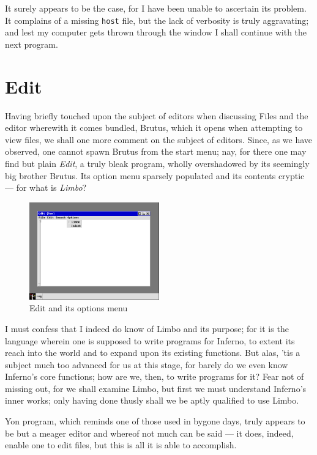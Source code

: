 \documentclass[a4paper,12pt]{report}
\begin{document}
      It surely appears to be the case, for I have been unable to ascertain its problem. It complains of a missing \texttt{host} file, but the lack of verbosity is truly aggravating; and lest my computer gets thrown through the window I shall continue with the next program.

      \section*{Edit}

      Having briefly touched upon the subject of editors when discussing Files and the editor wherewith it comes bundled, Brutus, which it opens when attempting to view files, we shall one more comment on the subject of editors. Since, as we have observed, one cannot spawn Brutus from the start menu; nay, for there one may find but plain \textit{Edit}, a truly bleak program, wholly overshadowed by its seemingly big brother Brutus. Its option menu sparsely populated and its contents cryptic — for what is \textit{Limbo}?

      \begin{figure}
        \centering
        \includegraphics[width=0.5\textwidth]{edit.png}
        \caption{Edit and its options menu}
      \end{figure}

      I must confess that I indeed do know of Limbo and its purpose; for it is the language wherein one is supposed to write programs for Inferno, to extent its reach into the world and to expand upon its existing functions. But alas, 'tis a subject much too advanced for us at this stage, for barely do we even know Inferno's core functions; how are we, then, to write programs for it? Fear not of missing out, for we shall examine Limbo, but first we must understand Inferno's inner works; only having done thusly shall we be aptly qualified to use Limbo.

      Yon program, which reminds one of those used in bygone days, truly appears to be but a meager editor and whereof not much can be said — it does, indeed, enable one to edit files, but this is all it is able to accomplish.
\end{document}
